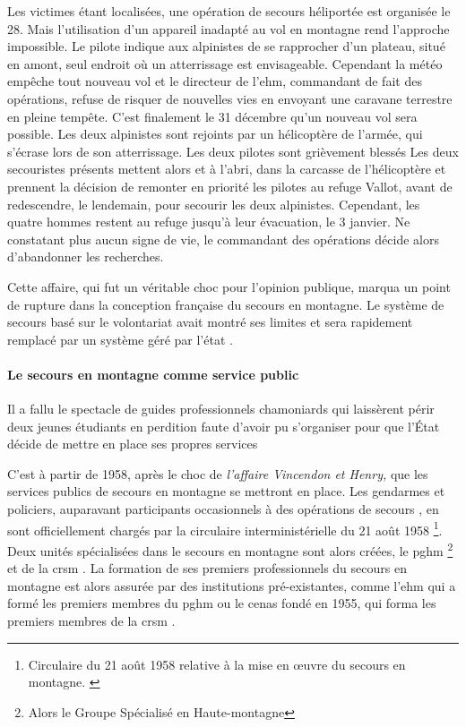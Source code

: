 Les victimes étant localisées, une opération de secours héliportée est
organisée le 28. Mais l'utilisation d'un appareil inadapté au vol en
montagne rend l'approche impossible. Le pilote indique aux alpinistes
de se rapprocher d'un plateau, situé en amont, seul endroit où un
atterrissage est envisageable. Cependant la météo empêche tout nouveau
vol et le directeur de l'\ac{ehm}, commandant de fait des opérations,
refuse de risquer de nouvelles vies en envoyant une caravane terrestre
en pleine tempête. C'est finalement le 31 décembre qu'un nouveau vol
sera possible. Les deux alpinistes sont rejoints par un hélicoptère de
l'armée, qui s'écrase lors de son atterrissage. Les deux pilotes sont
grièvement blessés Les deux secouristes présents mettent alors
 et  à l'abri, dans la carcasse de
l'hélicoptère et prennent la décision de remonter en priorité les
pilotes au refuge Vallot, avant de redescendre, le lendemain, pour
secourir les deux alpinistes. Cependant, les quatre hommes restent au
refuge jusqu’à leur évacuation, le 3 janvier. Ne constatant plus aucun
signe de vie, le commandant des opérations décide alors d'abandonner
les recherches.

Cette affaire, qui fut un véritable choc pour l’opinion publique,
marqua un point de rupture dans la conception française du secours en
montagne. Le système de secours basé sur le volontariat avait montré
ses limites et sera rapidement remplacé par un système géré par l'état
\autocite{Ballu1997}.

\paragraph{Le secours en montagne comme service public}
\label{par:1-1-1-1-2}

\begin{displayquote}
  \og Il a fallu le spectacle de guides professionnels chamoniards
  qui laissèrent périr deux jeunes étudiants en perdition faute
  d'avoir pu s'organiser pour que l'État décide de mettre en place ses
  propres services \textelp{}\fg{} \autocite{Descamps2018}
\end{displayquote}

C'est à partir de 1958, après le choc de \emph{l'affaire Vincendon et
  Henry,} que les services publics de secours en montagne se mettront
en place. Les gendarmes et policiers, auparavant participants
occasionnels à des opérations de secours
\autocite{Mollaret2016,CFDLD}, en sont officiellement chargés par la
circulaire interministérielle du 21 août 1958 \footnote{Circulaire  du 21 août 1958 relative à la mise en œuvre du secours en
  montagne. \label{fn:circulaire_21_aout_58}}. Deux unités
spécialisées dans le secours en montagne sont alors créées, le
\ac{pghm} \footnote{Alors le Groupe Spécialisé en Haute-montagne} et
de la \ac{crsm} \autocite{Halle2007}. La formation de ses premiers
professionnels du secours en montagne est alors assurée par des
institutions pré-existantes, comme l'\ac{ehm} qui a formé les premiers
membres du \ac{pghm} ou le \ac{cenas} fondé en 1955, qui forma les
premiers membres de la \ac{crsm} \autocite{Mezin2016}.

